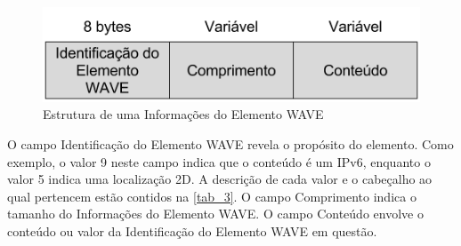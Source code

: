 \documentclass[
12pt,				%
openright,			%
oneside,			%
a4paper,			%
brazil,				%
]{abntex2}
\begin{document}
{\begin{anexosenv}
	    \begin{figure} [H]
		    \centering
		    \includegraphics[scale=.5]{figuras/cap3/36EstruturaInformacoesElementoWAVE}
		    \caption{\label{fig_36}Estrutura de uma Informações do Elemento WAVE}
	    \end{figure}
	
	    \par O campo Identificação do Elemento WAVE revela o propósito do elemento. Como exemplo, o valor 9 neste campo indica que o conteúdo é um IPv6, enquanto o valor 5 indica uma localização 2D. A descrição de cada valor e o cabeçalho ao qual pertencem estão contidos na \autoref{tab_3}. O campo Comprimento indica o tamanho do Informações do Elemento WAVE. O campo Conteúdo envolve o conteúdo ou valor da Identificação do Elemento WAVE em questão.
	
	
	    \newpage
	

\end{anexosenv}}
\end{document}
